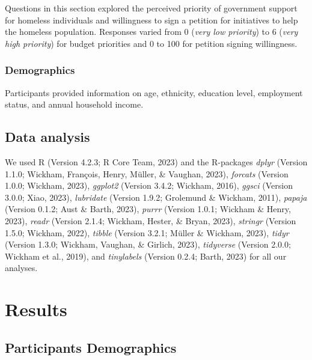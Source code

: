 \documentclass[
  man]{apa6}
\begin{document}
Questions in this section explored the perceived priority of government support for homeless individuals and willingness to sign a petition for initiatives to help the homeless population. Responses varied from 0 (\emph{very low priority}) to 6 (\emph{very high priority}) for budget priorities and 0 to 100 for petition signing willingness.

\hypertarget{demographics}{%
\subsubsection{Demographics}\label{demographics}}

Participants provided information on age, ethnicity, education level, employment status, and annual household income.

\hypertarget{data-analysis}{%
\subsection{Data analysis}\label{data-analysis}}

We used R (Version 4.2.3; R Core Team, 2023) and the R-packages \emph{dplyr} (Version 1.1.0; Wickham, François, Henry, Müller, \& Vaughan, 2023), \emph{forcats} (Version 1.0.0; Wickham, 2023), \emph{ggplot2} (Version 3.4.2; Wickham, 2016), \emph{ggsci} (Version 3.0.0; Xiao, 2023), \emph{lubridate} (Version 1.9.2; Grolemund \& Wickham, 2011), \emph{papaja} (Version 0.1.2; Aust \& Barth, 2023), \emph{purrr} (Version 1.0.1; Wickham \& Henry, 2023), \emph{readr} (Version 2.1.4; Wickham, Hester, \& Bryan, 2023), \emph{stringr} (Version 1.5.0; Wickham, 2022), \emph{tibble} (Version 3.2.1; Müller \& Wickham, 2023), \emph{tidyr} (Version 1.3.0; Wickham, Vaughan, \& Girlich, 2023), \emph{tidyverse} (Version 2.0.0; Wickham et al., 2019), and \emph{tinylabels} (Version 0.2.4; Barth, 2023) for all our analyses.

\hypertarget{results}{%
\section{Results}\label{results}}

\hypertarget{participants-demographics}{%
\subsection{Participants Demographics}\label{participants-demographics}}
\end{document}
